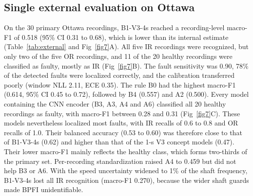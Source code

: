 \documentclass[10pt,letterpaper]{article}
\begin{document}
\subsection*{Single external evaluation on Ottawa}
On the 30 primary Ottawa recordings, B1-V3-4s reached a recording-level macro-F1 of 0.518 (95\% CI 0.31 to 0.68), which is lower than its internal estimate (Table~\ref{tab:external} and Fig~\ref{fig7}A). All five IR recordings were recognized, but only two of the five OR recordings, and 11 of the 20 healthy recordings were classified as faulty, mostly as IR (Fig~\ref{fig7}B). The fault sensitivity was 0.90, 78\% of the detected faults were localized correctly, and the calibration transferred poorly (window NLL 2.11, ECE 0.35). The rule B0 had the highest macro-F1 (0.614, 95\% CI 0.45 to 0.72), followed by B4 (0.557) and A2 (0.500). Every model containing the CNN encoder (B3, A3, A4 and A6) classified all 20 healthy recordings as faulty, with macro-F1 between 0.28 and 0.31 (Fig~\ref{fig7}C). These models nevertheless localized most faults, with IR recalls of 0.6 to 0.8 and OR recalls of 1.0. Their balanced accuracy (0.53 to 0.60) was therefore close to that of B1-V3-4s (0.62) and higher than that of the 1-s V3 concept models (0.47). Their lower macro-F1 mainly reflects the healthy class, which forms two-thirds of the primary set. Per-recording standardization raised A4 to 0.459 but did not help B3 or A6. With the speed uncertainty widened to 1\% of the shaft frequency, B1-V3-4s lost all IR recognition (macro-F1 0.270), because the wider shaft guards made BPFI unidentifiable.
\end{document}
